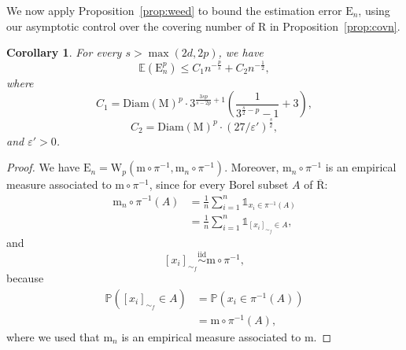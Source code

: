\documentclass[pdflatex,sn-mathphys-ay]{sn-jnl}%
\newtheorem{corollary}{Corollary}[theorem]
\newcommand{\reeb}{\mathrm{R}}
\newcommand{\man}{\mathrm{M}}
\newcommand{\mes}{\mathrm{m}}
\newcommand{\wasser}{\mathrm{W}}
\newcommand{\estim}{{\mathrm {E}}}
\newcommand{\diracn}{\mathrm{m}_n}
\newcommand{\diam}{\mathrm{Diam}}
\newcommand{\ind}{\mathds{1}}
\newcommand{\eps}{\varepsilon}
\theoremstyle{thmstyleone}%
\begin{document}
We now apply Proposition~\ref{prop:weed} to bound the estimation error $\estim_n$, using our asymptotic control over the covering number of $\reeb$ in Proposition~\ref{prop:covn}.

 \begin{corollary}\label{cor:estim}
For every $s>\max(2d,2p)$, we have
 $$\mathbb{E}\left(\estim_n^p\right)\leq C_1n^{-\frac{p}{s}}+C_2n^{-\frac{1}{2}},$$
 where 
 $$C_1=\diam\left(\man\right)^p\cdot3^{\frac{3sp}{s-2p}+1}\left(\frac{1}{3^{\frac{s}{2}-p}-1}+3\right),$$
 $$C_2=\diam\left(\man\right)^p\cdot\left(27/\eps'\right)^{\frac{s}{2}},$$
 and $\eps'>0$.
 \end{corollary}
 \begin{proof}
 We have $\estim_n=\wasser_p(\mes\circ\pi^{-1},\diracn\circ\pi^{-1})$. Moreover, $\diracn\circ\pi^{-1}$ is an empirical measure associated to $\mes\circ\pi^{-1}$, since for every Borel subset $A$ of $\overline{\reeb}$:
 \begin{align*}
     \diracn\circ\pi^{-1}(A)&=\frac{1}{n}\sum_{i=1}^n\ind_{x_i\in\pi^{-1}(A)} \\
     &=\frac{1}{n}\sum_{i=1}^n\ind_{[x_i]_{\sim_f}\in A},
 \end{align*}
 and 
 $$[x_i]_{\sim_f}\overset{\mathrm{iid}}{\sim}\mes\circ\pi^{-1},$$
 because 
  \begin{align*}
     \mathbb{P}([x_i]_{\sim_f}\in A)&=\mathbb{P}(x_i\in \pi^{-1}(A)) \\
     &=\mes\circ\pi^{-1}(A),
 \end{align*}
 where we used that $\diracn$ is an empirical measure associated to $\mes$.
 

\end{proof}
\end{document}
